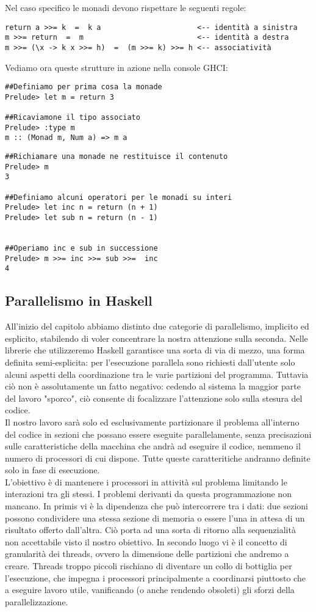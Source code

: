 Nel caso specifico le monadi devono rispettare le seguenti regole:
\begin{verbatim}
return a >>= k  =  k a                      <-- identità a sinistra
m >>= return  =  m                          <-- identità a destra
m >>= (\x -> k x >>= h)  =  (m >>= k) >>= h <-- associatività
\end{verbatim}
Vediamo ora queste strutture in azione nella console GHCI:
\begin{verbatim}
##Definiamo per prima cosa la monade
Prelude> let m = return 3

##Ricaviamone il tipo associato
Prelude> :type m
m :: (Monad m, Num a) => m a
\end{verbatim}
\newpage
\begin{verbatim}
##Richiamare una monade ne restituisce il contenuto
Prelude> m
3

##Definiamo alcuni operatori per le monadi su interi
Prelude> let inc n = return (n + 1)
Prelude> let sub n = return (n - 1)


##Operiamo inc e sub in successione
Prelude> m >>= inc >>= sub >>=  inc
4
\end{verbatim}
\subsection{Parallelismo in Haskell}
All'inizio del capitolo abbiamo distinto due categorie di parallelismo, implicito ed esplicito, stabilendo di voler concentrare la nostra attenzione sulla seconda. Nelle librerie che utilizzeremo Haskell garantisce una sorta di via di mezzo, una forma definita semi-esplicita: per l'esecuzione parallela sono richiesti dall'utente solo alcuni aspetti della coordinazione tra le varie partizioni del programma. Tuttavia ciò non è assolutamente un fatto negativo: cedendo al sistema la maggior parte del lavoro "sporco", ciò consente di focalizzare l'attenzione solo sulla stesura del codice.\\
Il nostro lavoro sarà solo ed esclusivamente partizionare il problema all'interno del codice in sezioni che possano essere eseguite parallelamente, senza precisazioni sulle caratteristiche della macchina che andrà ad eseguire il codice, nemmeno il numero di processori di cui dispone. Tutte queste caratteritiche andranno definite solo in fase di esecuzione.\\
L'obiettivo è di mantenere i processori in attività sul problema limitando le interazioni tra gli stessi. I problemi derivanti da questa programmazione non mancano. In primis vi è la dipendenza che può intercorrere tra i dati: due sezioni possono condividere una stessa sezione di memoria o essere l'una in attesa di un risultato offerto dall'altra. Ciò porta ad una sorta di ritorno alla sequenzialità non accettabile visto il nostro obiettivo. In secondo luogo vi è il concetto di granularità dei threads, ovvero la dimensione delle partizioni che andremo a creare. Threads troppo piccoli rischiano di diventare un collo di bottiglia per l'esecuzione, che impegna i processori principalmente a coordinarsi piuttosto che a eseguire lavoro utile, vanificando (o anche rendendo obsoleti) gli sforzi della parallelizzazione.
